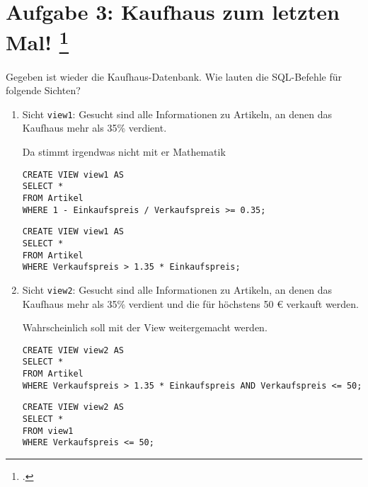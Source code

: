\documentclass{lehramt-informatik-aufgabe}
\begin{document}

\section{Aufgabe 3: Kaufhaus zum letzten Mal!
\footcite{db:ab:7}}

Gegeben ist wieder die Kaufhaus-Datenbank. Wie lauten die SQL-Befehle
für folgende Sichten?

\begin{enumerate}


\item Sicht \verb|view1|: Gesucht sind alle Informationen zu Artikeln,
an denen das Kaufhaus mehr als 35\% verdient.

\begin{antwort}[falsch]
Da stimmt irgendwas nicht mit er Mathematik
\begin{verbatim}
CREATE VIEW view1 AS
SELECT *
FROM Artikel
WHERE 1 - Einkaufspreis / Verkaufspreis >= 0.35;
\end{verbatim}
\end{antwort}

\begin{antwort}[muster]
\begin{verbatim}
CREATE VIEW view1 AS
SELECT *
FROM Artikel
WHERE Verkaufspreis > 1.35 * Einkaufspreis;
\end{verbatim}
\end{antwort}


\item Sicht \verb|view2|: Gesucht sind alle Informationen zu Artikeln,
an denen das Kaufhaus mehr als 35\% verdient und die für höchstens 50 €
verkauft werden.

\begin{antwort}[richtig]
Wahrscheinlich soll mit der View weitergemacht werden.
\begin{verbatim}
CREATE VIEW view2 AS
SELECT *
FROM Artikel
WHERE Verkaufspreis > 1.35 * Einkaufspreis AND Verkaufspreis <= 50;
\end{verbatim}
\end{antwort}

\begin{antwort}[muster]
\begin{verbatim}
CREATE VIEW view2 AS
SELECT *
FROM view1
WHERE Verkaufspreis <= 50;
\end{verbatim}
\end{antwort}
\end{enumerate}
\end{document}
